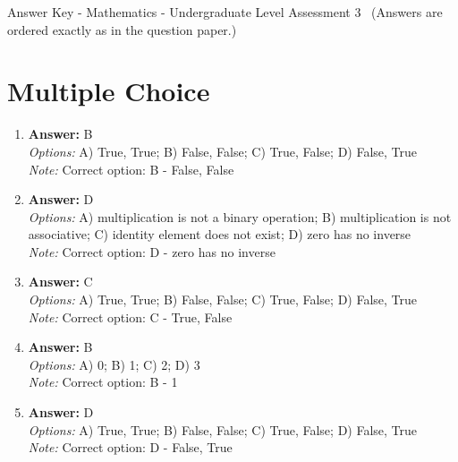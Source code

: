 \documentclass[12pt]{article}
\begin{document}
\begin{center}
Answer Key - Mathematics - Undergraduate Level Assessment 3 \
\small (Answers are ordered exactly as in the question paper.)
\end{center}

\section*{Multiple Choice}
\begin{enumerate}[label=\arabic*.]
\item \textbf{Answer:} B
\\ \textit{Options:} A) True, True; B) False, False; C) True, False; D) False, True
\\ \textit{Note:} Correct option: B - False, False
\item \textbf{Answer:} D
\\ \textit{Options:} A) multiplication is not a binary operation; B) multiplication is not associative; C) identity element does not exist; D) zero has no inverse
\\ \textit{Note:} Correct option: D - zero has no inverse
\item \textbf{Answer:} C
\\ \textit{Options:} A) True, True; B) False, False; C) True, False; D) False, True
\\ \textit{Note:} Correct option: C - True, False
\item \textbf{Answer:} B
\\ \textit{Options:} A) 0; B) 1; C) 2; D) 3
\\ \textit{Note:} Correct option: B - 1
\item \textbf{Answer:} D
\\ \textit{Options:} A) True, True; B) False, False; C) True, False; D) False, True
\\ \textit{Note:} Correct option: D - False, True
\end{enumerate}
\end{document}
